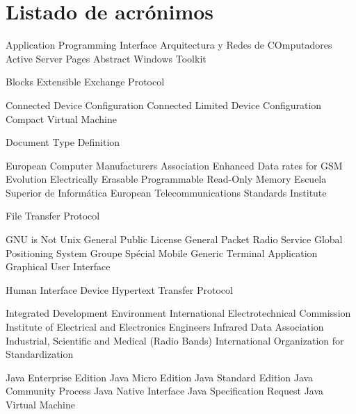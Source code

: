 
\chapter{Listado de acrónimos}

{\small
\begin{acronym}[XXXXXXXX]
       {Application Programming Interface}
      {Arquitectura y Redes de COmputadores}
       {Active Server Pages}
       {Abstract Windows Toolkit}

      {Blocks Extensible Exchange Protocol}
  
       {Connected Device Configuration}
      {Connected Limited Device Configuration}
       {Compact Virtual Machine}

       {Document Type Definition}

      {European Computer Manufacturers Association}
      {Enhanced Data rates for \acs{GSM} Evolution}
    {Electrically Erasable Programmable Read-Only Memory}
       {Escuela Superior de Informática}
      {European Telecommunications Standards Institute}

       {File Transfer Protocol}

       {GNU is Not Unix}
       {General Public License}
      {General Packet Radio Service}
       {Global Positioning System}
       {Groupe Spécial Mobile}
       {Generic Terminal Application}
       {Graphical User Interface}

       {Human Interface Device}
      {Hypertext Transfer Protocol}

       {Integrated Development Environment}
       {International Electrotechnical Commission}
      {Institute of Electrical and Electronics Engineers}
      {Infrared Data Association}
       {Industrial, Scientific and Medical (Radio Bands)}
       {International Organization for Standardization}

    {Java Enterprise Edition}
    {Java Micro Edition}
    {Java Standard Edition}
       {Java Community Process}
       {Java Native Interface}
       {Java Specification Request}
       {Java Virtual Machine}


\end{acronym}}
